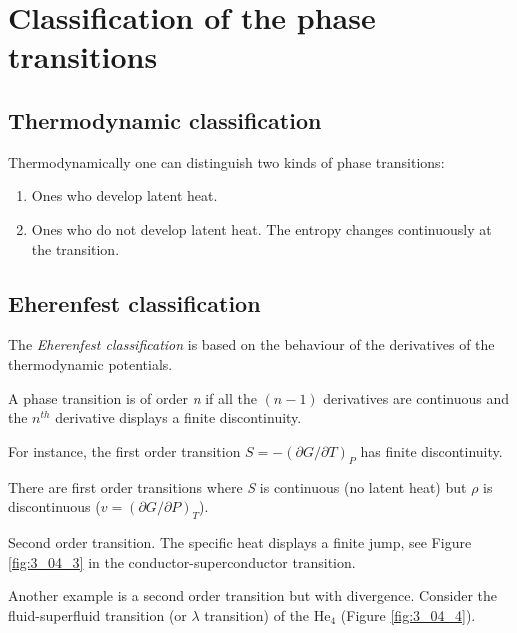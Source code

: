 \documentclass[../main/main.tex]{subfiles}
\begin{document}
\section{Classification of the phase transitions}

\subsection{Thermodynamic classification}
Thermodynamically one can distinguish two kinds of phase transitions:
\begin{enumerate}
\item Ones who develop latent heat.
\item Ones who do not develop latent heat. The entropy changes continuously at the transition.
\end{enumerate}
\subsection{Eherenfest classification}
The \emph{Eherenfest classification} is based on the behaviour of the derivatives of the thermodynamic potentials.

A phase transition is of order \emph{n} if all the \( (n-1) \)  derivatives are continuous and the \( n^{th} \) derivative displays a finite discontinuity.

\begin{example}
For instance, the first order transition \( S=-(\partial{G}/\partial{T}  )_P \) has finite discontinuity.
\end{example}
\begin{remark}
There are first order transitions where \emph{S} is continuous (no latent heat) but \( \rho  \) is discontinuous (\( v = (\partial{G}/\partial{P}  )_T \)).
\end{remark}
\begin{example}
Second order transition. The specific heat displays a finite jump, see Figure \ref{fig:3_04_3} in the conductor-superconductor transition.

Another example is a second order transition but with divergence. Consider the fluid-superfluid transition (or \( \lambda  \) transition) of the \( \text{He}_4 \) (Figure \ref{fig:3_04_4}).
\end{example}
\end{document}
